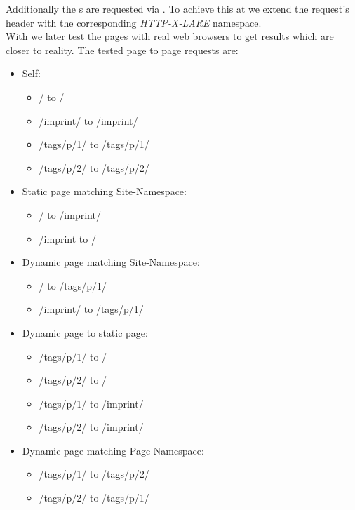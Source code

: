\noindent{}Additionally the \webPage{}s are requested via \lare{}.
To achieve this at \curl{} we extend the request's header with the corresponding \emph{HTTP-X-LARE} name\-space.
\\
With \selenium{} we later test the pages with real web browsers to get results which are closer to reality.
The tested page to page requests are:
\newpage{}
\begin{itemize}
  \item Self:
    \begin{itemize}
      \item / to /
      \item /imprint/ to /imprint/
      \item /tags/p/1/ to /tags/p/1/
      \item /tags/p/2/ to /tags/p/2/
    \end{itemize}
  \item Static page matching Site-Namespace:
    \begin{itemize}
      \item / to /imprint/
      \item /imprint to /
    \end{itemize}
  \item Dynamic page matching Site-Namespace:
    \begin{itemize}
      \item / to /tags/p/1/
      \item /imprint/ to /tags/p/1/
    \end{itemize}
  \item Dynamic page to static page:
    \begin{itemize}
      \item /tags/p/1/ to /
      \item /tags/p/2/ to /
      \item /tags/p/1/ to /imprint/
      \item /tags/p/2/ to /imprint/
    \end{itemize}
  \item Dynamic page matching Page-Namespace:
    \begin{itemize}
      \item /tags/p/1/ to /tags/p/2/
      \item /tags/p/2/ to /tags/p/1/
    \end{itemize}
\end{itemize}

